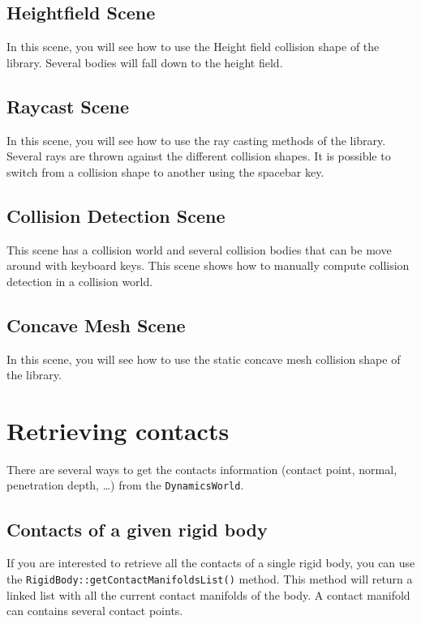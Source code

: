 \documentclass[a4paper,12pt]{article}
\begin{document}
    \subsection{Heightfield Scene}

    In this scene, you will see how to use the Height field collision shape of the library. Several bodies will fall
    down to the height field.

   \subsection{Raycast Scene}

    In this scene, you will see how to use the ray casting methods of the library. Several rays are thrown against the different collision shapes.
    It is possible to switch from a collision shape to another using the spacebar key.

   \subsection{Collision Detection Scene}

    This scene has a collision world and several collision bodies that can be move around with keyboard keys. This scene shows how to manually compute
    collision detection in a collision world.

    \subsection{Concave Mesh Scene}

    In this scene, you will see how to use the static concave mesh collision shape of the library.

    \section{Retrieving contacts}

    There are several ways to get the contacts information (contact point, normal, penetration depth, \dots) from the \texttt{DynamicsWorld}. \\

    \subsection{Contacts of a given rigid body}

    If you are interested to retrieve all the contacts of a single rigid body, you can use the \texttt{RigidBody::getContactManifoldsList()} method. This method will
    return a linked list with all the current contact manifolds of the body. A contact manifold can contains several contact points. \\
\end{document}
